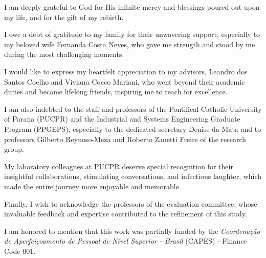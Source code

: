 \begin{agradecimentos}

    I am deeply grateful to God for His infinite mercy and blessings poured out upon my life, and for the gift of my rebirth.

    I owe a debt of gratitude to my family for their unwavering support, especially to my beloved wife Fernanda Costa Neves, who gave me strength and stood by me during the most challenging moments.
    
    I would like to express my heartfelt appreciation to my advisors, Leandro dos Santos Coelho and Viviana Cocco Mariani, who went beyond their academic duties and became lifelong friends, inspiring me to reach for excellence.
    
    I am also indebted to the staff and professors of the Pontifical Catholic University of Parana (PUCPR) and the Industrial and Systems Engineering Graduate Program (PPGEPS), especially to the dedicated secretary Denise da Mata and to professors Gilberto Reynoso-Meza and Roberto Zanetti Freire of the research group.
    
    My laboratory colleagues at PUCPR deserve special recognition for their insightful collaborations, stimulating conversations, and infectious laughter, which made the entire journey more enjoyable and memorable.
    
    Finally, I wish to acknowledge the professors of the evaluation committee, whose invaluable feedback and expertise contributed to the refinement of this study.
        
    I am honored to mention that this work was partially funded by the \textit{Coordenação de Aperfeiçoamento de Pessoal de Nível Superior - Brasil} (CAPES) - Finance Code 001.

\end{agradecimentos}

